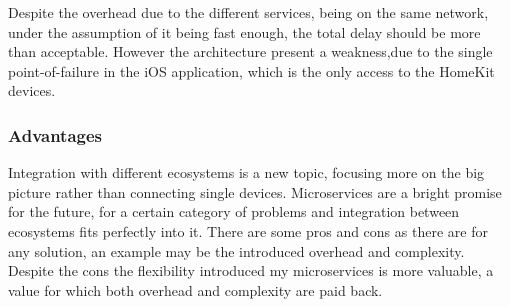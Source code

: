 Despite the overhead due to the different services, being on the same network, under the
assumption of it being fast enough, the total delay should be more than acceptable.
However the architecture present a weakness,due to the single point-of-failure in the
iOS application, which is the only access to the HomeKit devices.



\subsubsection{Advantages}

Integration with different ecosystems is a new topic, focusing more on the big
picture rather than connecting single devices. Microservices are a bright promise
for the future, for a certain category of problems and integration between ecosystems
fits perfectly into it. There are some pros and cons as there are for any solution,
an example may be the introduced overhead and complexity. Despite the cons the flexibility
introduced my microservices is more valuable, a value for which both overhead and complexity
are paid back.

